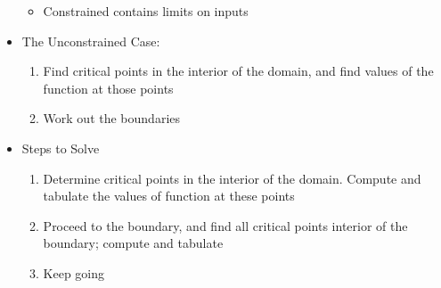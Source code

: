 \begin{itemize}
\begin{itemize}
      \item Constrained contains limits on inputs

    \end{itemize}

  \item The Unconstrained Case:

    \begin{enumerate}

      \item Find critical points in the interior of the domain, and find values of the function at those points

      \item Work out the boundaries

    \end{enumerate}

  \item Steps to Solve

    \begin{enumerate}

      \item Determine critical points in the interior of the domain. Compute and tabulate the values of function at these points

      \item Proceed to the boundary, and find all critical points interior of the boundary; compute and tabulate

      \item Keep going

    \end{enumerate}

\end{itemize}



